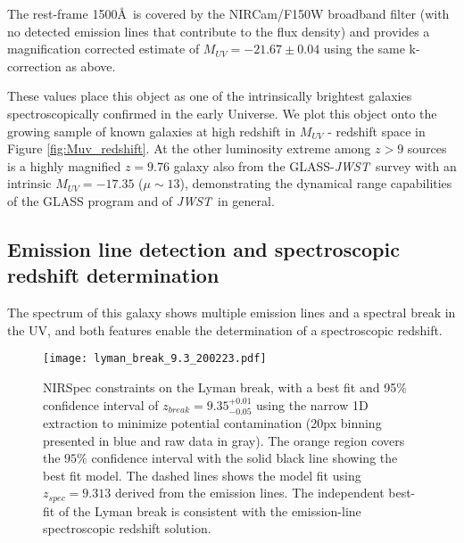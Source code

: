 \documentclass[sn-mathphys]{sn-jnl}%
\theoremstyle{thmstyleone}%
\theoremstyle{thmstyletwo}%
\theoremstyle{thmstylethree}%
\newcommand{\jwst}{\textit{JWST}}
\begin{document}
The rest-frame 1500\AA\ is covered by the NIRCam/F150W broadband filter (with no detected emission lines that contribute to the flux density) and provides a magnification corrected estimate of  ${M_{UV}=-21.67\pm0.04}$ using the same k-correction as above.

These values place this object as one of the intrinsically brightest galaxies spectroscopically confirmed in the early Universe. We plot this object onto the growing sample of known galaxies at high redshift in $M_{UV}$ - redshift space in Figure \ref{fig:Muv_redshift}. At the other luminosity extreme among $z>9$ sources is a highly magnified $z=9.76$ galaxy also from the GLASS-\jwst\ survey \citep{Roberts-Borsani22b} with an intrinsic $M_{UV}=-17.35$ ($\mu\sim13$), demonstrating the dynamical range capabilities of the GLASS program and of \jwst\ in general.

\subsection{Emission line detection and spectroscopic redshift determination} \label{sec:redshift}

The spectrum of this galaxy shows multiple emission lines and a spectral break in the UV, and both features enable the determination of a spectroscopic redshift.

\begin{figure*}
    \centering
    \texttt{[image: lyman\_break\_9.3\_200223.pdf]}
    \caption{NIRSpec constraints on the Lyman break, with a best fit and 95$\%$ confidence interval of $z_{break}=9.35_{-0.05}^{+0.01}$ using the narrow 1D extraction to minimize potential contamination (20px binning presented in blue and raw data in gray).
    The orange region covers the $95\%$ confidence interval with the solid black line showing the best fit model. The dashed lines shows the model fit using $z_{spec}=9.313$ derived from the emission lines. The independent best-fit of the Lyman break is consistent with the emission-line spectroscopic redshift solution.}
    \label{fig:lyman_break}
\end{figure*}
\end{document}
